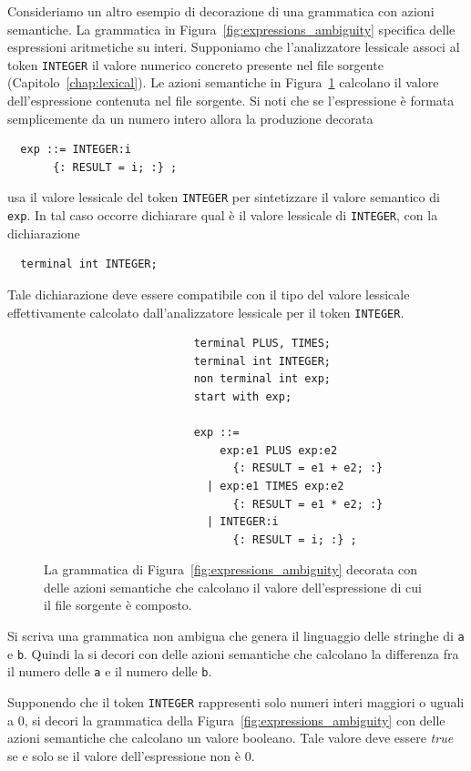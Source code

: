 Consideriamo un altro esempio di decorazione di una grammatica
con azioni semantiche. La grammatica in
Figura~\ref{fig:expressions_ambiguity} specifica delle espressioni aritmetiche
su interi. Supponiamo che l'analizzatore lessicale associ al token
\texttt{INTEGER} il valore numerico concreto presente nel file
sorgente (Capitolo~\ref{chap:lexical}). Le azioni semantiche in
Figura~\ref{fig:expressions_decoration} calcolano il valore dell'espressione
contenuta nel file sorgente. Si noti che se l'espressione \`e formata
semplicemente da un numero intero allora la produzione decorata
%
\begin{verbatim}
  exp ::= INTEGER:i
       {: RESULT = i; :} ;
\end{verbatim}
%
usa il valore lessicale del token \texttt{INTEGER} per sintetizzare il
valore semantico di \texttt{exp}. In tal caso occorre dichiarare
qual \`e il valore lessicale di \texttt{INTEGER}, con la dichiarazione
%
\begin{verbatim}
  terminal int INTEGER;
\end{verbatim}
%
Tale dichiarazione deve essere compatibile con il tipo del valore
lessicale effettivamente calcolato dall'analizzatore lessicale per il token
\texttt{INTEGER}.

\begin{figure}[t]
\begin{verbatim}
                       terminal PLUS, TIMES;
                       terminal int INTEGER;
                       non terminal int exp;
                       start with exp;

                       exp ::=
                           exp:e1 PLUS exp:e2
                             {: RESULT = e1 + e2; :}
                         | exp:e1 TIMES exp:e2
                             {: RESULT = e1 * e2; :}
                         | INTEGER:i
                             {: RESULT = i; :} ;
\end{verbatim}
\caption{La grammatica di Figura~\ref{fig:expressions_ambiguity}
         decorata con delle
         azioni semantiche che calcolano il valore dell'espressione di cui
         il file sorgente \`e composto.}
  \label{fig:expressions_decoration}
\end{figure}

\begin{exercise}\label{ex:decoration1}
Si scriva una grammatica non ambigua che genera il linguaggio delle
stringhe di \texttt{a} e \texttt{b}. Quindi la si decori con delle
azioni semantiche che calcolano la differenza fra il numero delle \texttt{a}
e il numero delle \texttt{b}.
\end{exercise}
%
\begin{exercise}\label{ex:decoration2}
Supponendo che il token \texttt{INTEGER} rappresenti solo numeri interi
maggiori o uguali a $0$, si decori la grammatica della
Figura~\ref{fig:expressions_ambiguity} con delle azioni semantiche che
calcolano un valore booleano. Tale valore deve essere \textit{true}
se e solo se il valore dell'espressione non \`e $0$.
\end{exercise}

